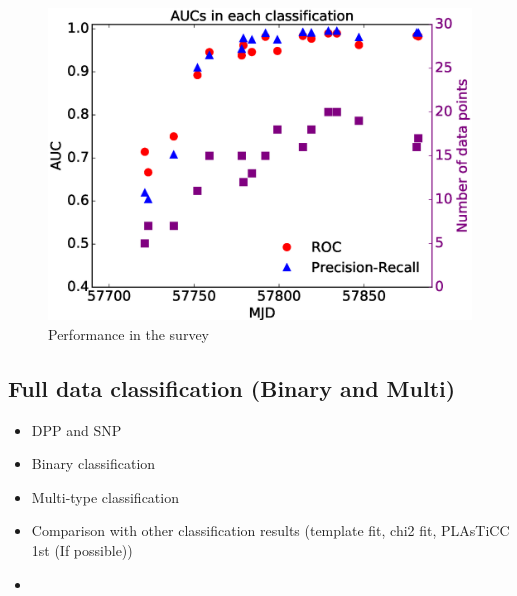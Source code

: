 \documentclass{pasj01}
\begin{document}
%
%
\begin{figure}[ht]
  \begin{center}
     \includegraphics[width=\columnwidth]{figures/AUCs_190215.eps}
  \end{center}
  \caption{%
  Performance in the survey
  }%
  \label{fig:realtimeAUCs}
\end{figure}
%
\subsection{Full data classification (Binary and Multi)}
\begin{itemize}
\item DPP and SNP
\item Binary classification
\item Multi-type classification
\item Comparison with other classification results (template fit, chi2 fit, PLAsTiCC 1st (If possible))
\item 
\end{itemize}
\end{document}

